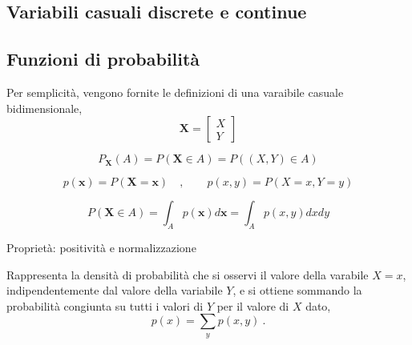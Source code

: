 \subsection{Variabili casuali discrete e continue}
\subsection{Funzioni di probabilità}
Per semplicità, vengono fornite le definizioni di una varaibile casuale bidimensionale, 
\begin{equation}
    \mathbf{X} = \begin{bmatrix} X \\ Y \end{bmatrix}
\end{equation}
\begin{definition}
    \begin{equation}
        P_{\mathbf{X}}(A) = P(\mathbf{X} \in A) = P((X,Y) \in A)
    \end{equation}
\end{definition}

\begin{definition} 
    \begin{equation}
        p(\mathbf{x}) = P(\mathbf{X} = \mathbf{x}) \quad , \qquad p(x,y) = P(X=x, Y=y)
    \end{equation}
\end{definition}

\begin{definition}
    \begin{equation}
        P(\mathbf{X} \in A) = \int_{A} p(\mathbf{x}) d \mathbf{x} = \int_A p(x,y) dx dy
    \end{equation}
\end{definition}

{\color{red} Proprietà: positività e normalizzazione}

\begin{definition}
    Rappresenta la densità di probabilità che si osservi il valore della varabile $X = x$, indipendentemente dal valore della variabile $Y$, e si ottiene sommando la probabilità congiunta su tutti i valori di $Y$ per il valore di $X$ dato,
    \begin{equation}
        p(x) = \sum_{y} p(x,y) \ .
    \end{equation}
\end{definition}

